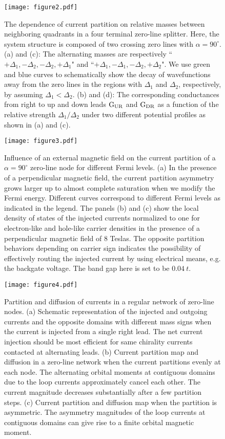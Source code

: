 \documentclass[journal=nalefd,manuscript=communication]{achemso}
\begin{document}
\begin{figure}
  \texttt{[image: figure2.pdf]}
  \caption{The dependence of current partition on relative masses between neighboring quadrants in a four terminal zero-line splitter. Here, the system structure is composed of two crossing zero lines with $\alpha=90^\circ$. (a) and (c): The alternating masses are respectively ``$+\Delta_1,-\Delta_2,-\Delta_2,+\Delta_1$" and ``$+\Delta_1,-\Delta_1,-\Delta_2,+\Delta_2$". We use green and blue curves to schematically show the decay of wavefunctions away from the zero lines in the regions with $\Delta_1$ and $\Delta_2$, respectively, by assuming $\Delta_1<\Delta_2$. (b) and (d): The corresponding conductances from right to up and down leads $\rm G_{UR}$ and $\rm G_{DR}$ as a function of the relative strength $\Delta_1/\Delta_2$ under two different potential profiles as shown in (a) and (c).}
  \label{Fig2}
\end{figure}

\newpage

\begin{figure}
  \texttt{[image: figure3.pdf]}
  \caption{Influence of an external magnetic field on the current partition of a $\alpha=90^\circ$ zero-line node for different Fermi levels. (a) In the presence of a perpendicular magnetic field, the current partition asymmetry grows larger up to almost complete saturation when we modify the Fermi energy. Different curves correspond to different Fermi levels as indicated in the legend. The panels (b) and (c) show the local density of states of the injected currents normalized to one for electron-like and hole-like carrier densities in the presence of a perpendicular magnetic field of 8 Teslas. The opposite partition behaviors depending on carrier sign indicates the possibility of effectively routing the injected current by using electrical means, e.g. the backgate voltage. The band gap here is set to be $0.04~t$.}
  \label{Fig3}
\end{figure}

\begin{figure}
  \texttt{[image: figure4.pdf]}
  \caption{Partition and diffusion of currents in a regular network of zero-line nodes. (a) Schematic representation of the injected and outgoing currents and the opposite domains with different mass signs when the current is injected from a single right lead. The net current injection should be most efficient for same chirality currents contacted at alternating leads. (b) Current partition map and diffusion in a zero-line network when the current partitions evenly at each node. The alternating orbital moments at contiguous domains due to the loop currents approximately cancel each other. The current magnitude decreases substantially after a few partition steps. (c) Current partition and diffusion map when the partition is asymmetric. The asymmetry magnitudes of the loop currents at contiguous domains can give rise to a finite orbital magnetic moment.}
  \label{Fig4}
\end{figure}
\end{document}
